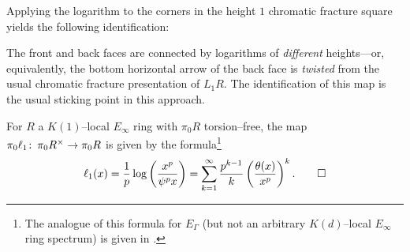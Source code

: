 \begin{remark}
Applying the logarithm to the corners in the height $1$ chromatic fracture square yields the following identification:
\begin{center}
\end{center}
The front and back faces are connected by logarithms of \emph{different} heights---or, equivalently, the bottom horizontal arrow of the back face is \emph{twisted} from the usual chromatic fracture presentation of $L_1 R$.  The identification of this map is the usual sticking point in this approach.
\end{remark}

\begin{theorem}
For $R$ a $K(1)$--local $E_\infty$ ring with $\pi_0 R$ torsion--free, the map $\pi_0 \ell_1\colon\thinspace \pi_0 R^\times \to \pi_0 R$ is given by the formula\footnote{The analogue of this formula for $E_\Gamma$ (but not an arbitrary $K(d)$--local $E_\infty$ ring spectrum) is given in \cite[Subsection 1.10]{RezkLogarithm}.} \[\ell_1(x) = \frac{1}{p} \log\left(\frac{x^p}{\psi^p x}\right) = \sum_{k=1}^\infty \frac{p^{k-1}}{k} \left(\frac{\theta(x)}{x^p}\right)^k. \qed\]
\end{theorem}

